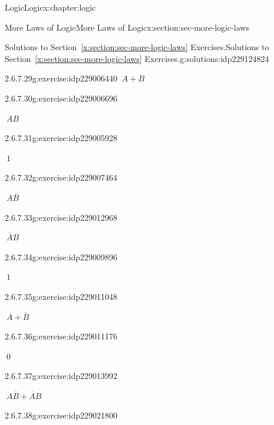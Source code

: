 \documentclass[twoside,10pt,]{book}
\newcommand{\xreffont}{\relax}
\numberwithin{equation}{section}
\begin{document}
\begin{chapterptx}{Logic}{}{Logic}{}{}{x:chapter:logic}
\begin{sectionptx}{More Laws of Logic}{}{More Laws of Logic}{}{}{x:section:sec-more-logic-laws}
\begin{solutions-subsection}{Solutions to Section~{\xreffont\ref*{x:section:sec-more-logic-laws}} Exercises.}{}{Solutions to Section~{\xreffont\ref*{x:section:sec-more-logic-laws}} Exercises.}{}{}{g:solutions:idp229124824}
\begin{exercisegroup}
\begin{divisionsolutioneg}{2.6.7.29}{}{g:exercise:idp229006440}
\noindent\hypertarget{g:solution:idp229009384-main}{}\(\ A+B\)\end{divisionsolutioneg}%
\begin{divisionsolutioneg}{2.6.7.30}{}{g:exercise:idp229006696}%
\par\smallskip%
\noindent\hypertarget{g:solution:idp229006824-main}{}\(\ AB\)\end{divisionsolutioneg}%
\begin{divisionsolutioneg}{2.6.7.31}{}{g:exercise:idp229005928}%
\par\smallskip%
\noindent\hypertarget{g:solution:idp229011816-main}{}\(\ 1\)\end{divisionsolutioneg}%
\begin{divisionsolutioneg}{2.6.7.32}{}{g:exercise:idp229007464}%
\par\smallskip%
\noindent\hypertarget{g:solution:idp229007208-main}{}\(\ A\overline{B}{}\)\end{divisionsolutioneg}%
\begin{divisionsolutioneg}{2.6.7.33}{}{g:exercise:idp229012968}%
\par\smallskip%
\noindent\hypertarget{g:solution:idp229007720-main}{}\(\ \overline{A}{}B\)\end{divisionsolutioneg}%
\begin{divisionsolutioneg}{2.6.7.34}{}{g:exercise:idp229009896}%
\par\smallskip%
\noindent\hypertarget{g:solution:idp229008872-main}{}\(\ 1\)\end{divisionsolutioneg}%
\begin{divisionsolutioneg}{2.6.7.35}{}{g:exercise:idp229011048}%
\par\smallskip%
\noindent\hypertarget{g:solution:idp229010280-main}{}\(\ A+\overline{B}{}\)\end{divisionsolutioneg}%
\begin{divisionsolutioneg}{2.6.7.36}{}{g:exercise:idp229011176}%
\par\smallskip%
\noindent\hypertarget{g:solution:idp229013480-main}{}\(\ 0\)\end{divisionsolutioneg}%
\begin{divisionsolutioneg}{2.6.7.37}{}{g:exercise:idp229013992}%
\par\smallskip%
\noindent\hypertarget{g:solution:idp229018088-main}{}\(\ A\overline{B}{}+\overline{A}{}B\)\end{divisionsolutioneg}%
\begin{divisionsolutioneg}{2.6.7.38}{}{g:exercise:idp229021800}%

\end{divisionsolutioneg}
\end{exercisegroup}
\end{solutions-subsection}
\end{sectionptx}
\end{chapterptx}
\end{document}
